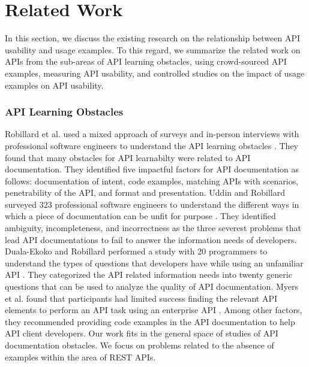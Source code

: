\section{Related Work}
\label{sec:related_work}

In this section, we discuss the existing research on the relationship between API usability and usage examples. To this regard, we summarize the related work on APIs from the sub-areas of API learning obstacles, using crowd-sourced API examples, measuring API usability, and controlled studies on the impact of usage examples on API usability.


\subsubsection{API Learning Obstacles}
Robillard et al. used a mixed approach of surveys and in-person interviews with professional software engineers to understand the API learning obstacles \cite{Robillard_what_makes} \cite{Robillard_a_field_study}. They found that many obstacles for API learnabilty were related to API documentation. They identified five impactful factors for API documentation as follows: documentation of intent, code examples, matching APIs with scenarios, penetrability of the API, and format and presentation. Uddin and Robillard surveyed 323 professional software engineers to understand the different ways in which a piece of documentation can be unfit for purpose \cite{g_uddin}. They identified ambiguity, incompleteness, and incorrectness as the three severest problems that lead API documentations to fail to answer the information needs of developers. Duala-Ekoko and Robillard performed a study with 20 programmers to understand the types of questions that developers have while using an unfamiliar API \cite{Duala-Ekoko:2012:AAQ:2337223.2337255}. They categorized the API related information needs into twenty generic questions that can be used to analyze the quality of API documentation. Myers et al. found that participants had limited success finding the relevant API elements to perform an API task using an enterprise API \cite{Myers_study}. Among other factors, they recommended providing code examples in the API documentation to help API client developers. Our work fits in the general space of studies of API documentation obstacles. We focus on problems related to the absence of examples within the area of REST APIs.

